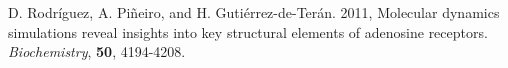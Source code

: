 \documentclass[10pt, oneside, pdftex]{article}
\begin{document}
\begin{thebibliography}{10}
 D.  Rodr\'{i}guez,  A.  Pi\~{n}eiro,  and H. Guti\'{e}rrez-de-Ter\'{a}n. 
2011, Molecular dynamics simulations reveal insights into key structural
elements  of  adenosine  receptors. \textit{Biochemistry}, \textbf{50}, 4194-4208.
\end{thebibliography}








\end{document}
